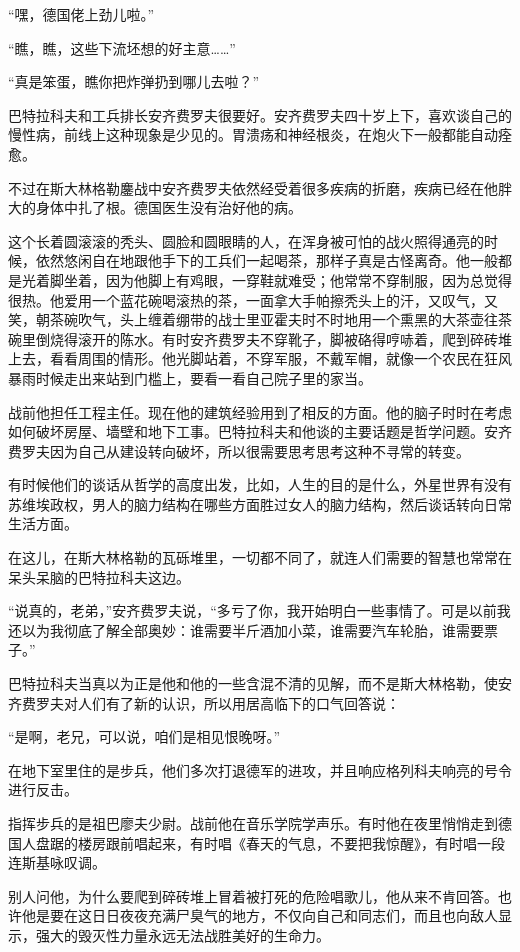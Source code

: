 “嘿，德国佬上劲儿啦。”

“瞧，瞧，这些下流坯想的好主意……”

“真是笨蛋，瞧你把炸弹扔到哪儿去啦？”

巴特拉科夫和工兵排长安齐费罗夫很要好。安齐费罗夫四十岁上下，喜欢谈自己的慢性病，前线上这种现象是少见的。胃溃疡和神经根炎，在炮火下一般都能自动痊愈。

不过在斯大林格勒鏖战中安齐费罗夫依然经受着很多疾病的折磨，疾病已经在他胖大的身体中扎了根。德国医生没有治好他的病。

这个长着圆滚滚的秃头、圆脸和圆眼睛的人，在浑身被可怕的战火照得通亮的时候，依然悠闲自在地跟他手下的工兵们一起喝茶，那样子真是古怪离奇。他一般都是光着脚坐着，因为他脚上有鸡眼，一穿鞋就难受；他常常不穿制服，因为总觉得很热。他爱用一个蓝花碗喝滚热的茶，一面拿大手帕擦秃头上的汗，又叹气，又笑，朝茶碗吹气，头上缠着绷带的战士里亚霍夫时不时地用一个熏黑的大茶壶往茶碗里倒烧得滚开的陈水。有时安齐费罗夫不穿靴子，脚被硌得哼哧着，爬到碎砖堆上去，看看周围的情形。他光脚站着，不穿军服，不戴军帽，就像一个农民在狂风暴雨时候走出来站到门槛上，要看一看自己院子里的家当。

战前他担任工程主任。现在他的建筑经验用到了相反的方面。他的脑子时时在考虑如何破坏房屋、墙壁和地下工事。巴特拉科夫和他谈的主要话题是哲学问题。安齐费罗夫因为自己从建设转向破坏，所以很需要思考思考这种不寻常的转变。

有时候他们的谈话从哲学的高度出发，比如，人生的目的是什么，外星世界有没有苏维埃政权，男人的脑力结构在哪些方面胜过女人的脑力结构，然后谈话转向日常生活方面。

在这儿，在斯大林格勒的瓦砾堆里，一切都不同了，就连人们需要的智慧也常常在呆头呆脑的巴特拉科夫这边。

“说真的，老弟，”安齐费罗夫说，“多亏了你，我开始明白一些事情了。可是以前我还以为我彻底了解全部奥妙：谁需要半斤酒加小菜，谁需要汽车轮胎，谁需要票子。”

巴特拉科夫当真以为正是他和他的一些含混不清的见解，而不是斯大林格勒，使安齐费罗夫对人们有了新的认识，所以用居高临下的口气回答说：

“是啊，老兄，可以说，咱们是相见恨晚呀。”

在地下室里住的是步兵，他们多次打退德军的进攻，并且响应格列科夫响亮的号令进行反击。

指挥步兵的是祖巴廖夫少尉。战前他在音乐学院学声乐。有时他在夜里悄悄走到德国人盘踞的楼房跟前唱起来，有时唱《春天的气息，不要把我惊醒》，有时唱一段连斯基咏叹调。

别人问他，为什么要爬到碎砖堆上冒着被打死的危险唱歌儿，他从来不肯回答。也许他是要在这日日夜夜充满尸臭气的地方，不仅向自己和同志们，而且也向敌人显示，强大的毁灭性力量永远无法战胜美好的生命力。

